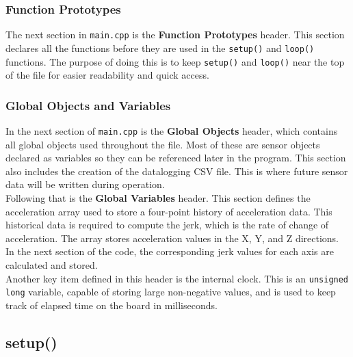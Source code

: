 \documentclass[12pt]{report}
\begin{document}
\subsubsection*{Function Prototypes}

The next section in \texttt{main.cpp} is the \textbf{Function Prototypes} header. This section declares all the functions before they are used in the \texttt{setup()} and \texttt{loop()} functions. The purpose of doing this is to keep \texttt{setup()} and \texttt{loop()} near the top of the file for easier readability and quick access. \\

\subsubsection*{Global Objects and Variables}

In the next section of \texttt{main.cpp} is the \textbf{Global Objects} header, which contains all global objects used throughout the file. Most of these are sensor objects declared as variables so they can be referenced later in the program. This section also includes the creation of the datalogging CSV file. This is where future sensor data will be written during operation. \\

Following that is the \textbf{Global Variables} header. This section defines the acceleration array used to store a four-point history of acceleration data. This historical data is required to compute the jerk, which is the rate of change of acceleration. The array stores acceleration values in the X, Y, and Z directions. In the next section of the code, the corresponding jerk values for each axis are calculated and stored. \\

Another key item defined in this header is the internal clock. This is an \texttt{unsigned long} variable, capable of storing large non-negative values, and is used to keep track of elapsed time on the board in milliseconds. \\

\subsection*{setup()}
\end{document}
